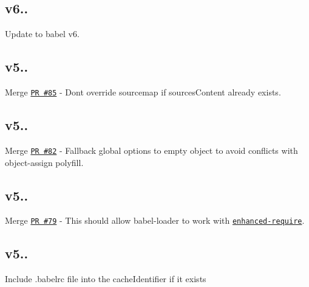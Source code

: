 \subsection*{v6..}


\begin{DoxyItemize}
\item Update to babel v6.
\end{DoxyItemize}

\subsection*{v5..}


\begin{DoxyItemize}
\item Merge \href{https://github.com/babel/babel-loader/pull/85}{\tt PR \#85} -\/ Don\textquotesingle{}t override sourcemap if sources\+Content already exists.
\end{DoxyItemize}

\subsection*{v5..}


\begin{DoxyItemize}
\item Merge \href{https://github.com/babel/babel-loader/pull/82}{\tt PR \#82} -\/ Fallback global options to empty object to avoid conflicts with object-\/assign polyfill.
\end{DoxyItemize}

\subsection*{v5..}


\begin{DoxyItemize}
\item Merge \href{https://github.com/babel/babel-loader/pull/79}{\tt PR \#79} -\/ This should allow babel-\/loader to work with \href{https://github.com/webpack/enhanced-require}{\tt enhanced-\/require}.
\end{DoxyItemize}

\subsection*{v5..}


\begin{DoxyItemize}
\item Include {\ttfamily .babelrc} file into the {\ttfamily cache\+Identifier} if it exists 
\end{DoxyItemize}